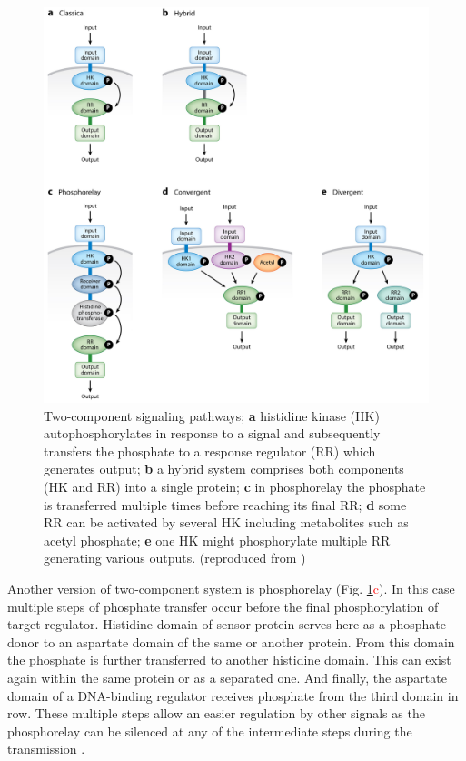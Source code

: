 \begin{figure}[h!]
  \centering
  \includegraphics[scale=0.85]{text/Pictures/TwoComponent.jpeg}
	\caption{Two-component signaling pathways; \textbf{a} histidine kinase (HK) autophosphorylates in response to a signal and subsequently transfers the phosphate to a response regulator (RR) which generates output; \textbf{b} a hybrid system comprises both components (HK and RR) into a single protein; \textbf{c} in phosphorelay the phosphate is transferred multiple times before reaching its final RR; \textbf{d} some RR can be activated by several HK including metabolites such as acetyl phosphate; \textbf{e} one HK might phosphorylate multiple RR generating various outputs. (reproduced from \cite{groisman2016feedback})}
	\label{two}
\end{figure}

Another version of two-component system is phosphorelay (Fig. \ref{two}\textcolor{red}{c}).
In this case multiple steps of phosphate transfer occur before the final phosphorylation of target regulator.
Histidine domain of sensor protein serves here as a phosphate donor to an aspartate domain of the same or another protein.
From this domain the phosphate is further transferred to another histidine domain.
This can exist again within the same protein or as a separated one.
And finally, the aspartate domain of a DNA-binding regulator receives phosphate from the third domain in row.
These multiple steps allow an easier regulation by other signals as the phosphorelay can be silenced at any of the intermediate steps during the transmission \cite{perego2001pentapeptide, groisman2016feedback}.

